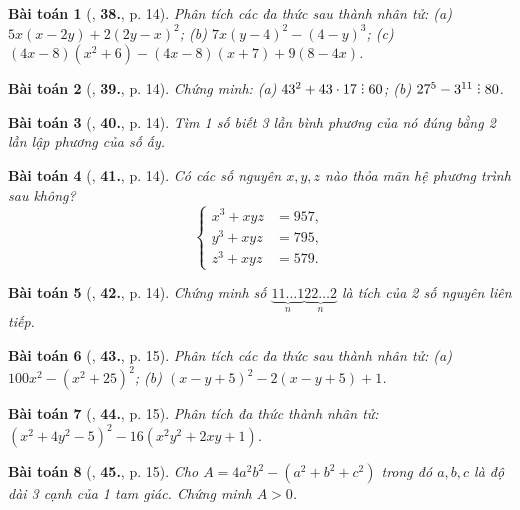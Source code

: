 \documentclass{article}
\numberwithin{equation}{section}
\newtheorem{baitoan}{Bài toán}
\DeclareRobustCommand{\divby}{%
	\mathrel{\vbox{\baselineskip.65ex\lineskiplimit0pt\hbox{.}\hbox{.}\hbox{.}}}%
}
\begin{document}
\begin{baitoan}[\cite{Tuyen_Toan_8}, \textbf{38.}, p. 14]
	Phân tích các đa thức sau thành nhân tử: (a) $5x(x - 2y) + 2(2y - x)^2$; (b) $7x(y - 4)^2 - (4 - y)^3$; (c) $(4x - 8)(x^2 + 6) - (4x - 8)(x + 7) + 9(8 - 4x)$.
\end{baitoan}

\begin{baitoan}[\cite{Tuyen_Toan_8}, \textbf{39.}, p. 14]
	Chứng minh: (a) $43^2 + 43\cdot17\divby60$; (b) $27^5 - 3^{11}\divby80$.
\end{baitoan}

\begin{baitoan}[\cite{Tuyen_Toan_8}, \textbf{40.}, p. 14]
	Tìm 1 số biết 3 lần bình phương của nó đúng bằng 2 lần lập phương của số ấy.
\end{baitoan}

\begin{baitoan}[\cite{Tuyen_Toan_8}, \textbf{41.}, p. 14]
	Có các số nguyên $x,y,z$ nào thỏa mãn hệ phương trình sau không?
	\begin{equation*}
		\left\{\begin{split}
			x^3 + xyz &= 957,\\
			y^3 + xyz &= 795,\\
			z^3 + xyz &= 579.
		\end{split}\right.
	\end{equation*}
\end{baitoan}

\begin{baitoan}[\cite{Tuyen_Toan_8}, \textbf{42.}, p. 14]
	Chứng minh số $\underbrace{11\ldots1}_n\underbrace{22\ldots2}_n$ là tích của 2 số nguyên liên tiếp.
\end{baitoan}

\begin{baitoan}[\cite{Tuyen_Toan_8}, \textbf{43.}, p. 15]
	Phân tích các đa thức sau thành nhân tử: (a) $100x^2 - (x^2 + 25)^2$; (b) $(x - y + 5)^2 - 2(x - y + 5) + 1$.
\end{baitoan}

\begin{baitoan}[\cite{Tuyen_Toan_8}, \textbf{44.}, p. 15]
	Phân tích đa thức thành nhân tử: $(x^2 + 4y^2 - 5)^2 - 16(x^2y^2 + 2xy + 1)$.
\end{baitoan}

\begin{baitoan}[\cite{Tuyen_Toan_8}, \textbf{45.}, p. 15]
	Cho $A = 4a^2b^2 - (a^2 + b^2 + c^2)$ trong đó $a,b,c$ là độ dài 3 cạnh của 1 tam giác. Chứng minh $A > 0$.
\end{baitoan}
\end{document}
